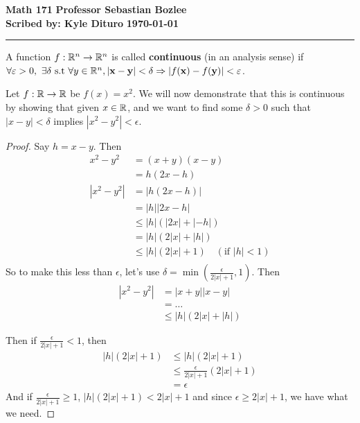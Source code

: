 \documentclass[12pt, twosided]{article}
\begin{document}
\noindent \textbf{Math 171} \hfill \textbf{Professor Sebastian Bozlee} \\
\textbf{Scribed by: Kyle Dituro} \hfill \textbf{\today}\hrule
\vspace{.2in}

\begin{df}
  A function \(f: \mathbb{R}^n \to \mathbb{R}^n\) is called \textbf{continuous} (in an analysis sense) if \(\forall \varepsilon > 0,\ \exists \delta \text{ s.t } \forall y \in \mathbb{R}^n, |\mathbf{x} - \mathbf{y}| < \delta \Rightarrow |f(\mathbf{x}) - f(\mathbf{y})| < \varepsilon\).
\end{df}

\begin{exa}
  Let \(f: \mathbb{R} \to \mathbb{R} \) be \(f(x) = x^2\). We will now demonstrate that this is continuous by showing that given \(x \in \mathbb{R}\), and we want to find some \(\delta > 0\) such that \(|x - y| < \delta \) implies \(|x^2 - y^2| < \epsilon\).

  \begin{proof}
    Say \(h = x - y\). Then
    \begin{align*}
      x^2 - y^2 &= (x + y)(x - y) \\
                &= h(2x - h) \\
      |x^2 - y^2| &= |h(2x - h)| \\
                &= |h||2x-h| \\
                &\leq |h|(|2x| + |-h|) \\
                &= |h|(2|x| + |h|) \\
                &\leq |h|(2|x| + 1) \quad (\text{if } |h| < 1) \\
    \end{align*}
    So to make this less than \(\epsilon\), let's use \(\delta = \min\left(\frac{\epsilon}{2|x|+1},1\right).\) Then
    \begin{align*}
      |x^2 - y^2| &= |x + y||x - y| \\
                  &=\ldots \\
                  &\leq |h|(2|x| + |h|)
    \end{align*}

    Then if \(\frac{\epsilon}{2|x| + 1} < 1\), then
    \begin{align*}
      |h|(2|x| + 1) &\leq |h|(2|x| + 1) \\
                    &\leq \frac{\epsilon}{2|x| + 1}(2|x| + 1) \\
                    &= \epsilon
    \end{align*}
    And if \(\frac{\epsilon}{2|x| + 1} \geq 1\),
      \(|h|(2|x| + 1) < 2|x| + 1\) and since \(\epsilon \geq 2|x| + 1\), we have what we need.
  \end{proof}
\end{exa}
\end{document}

